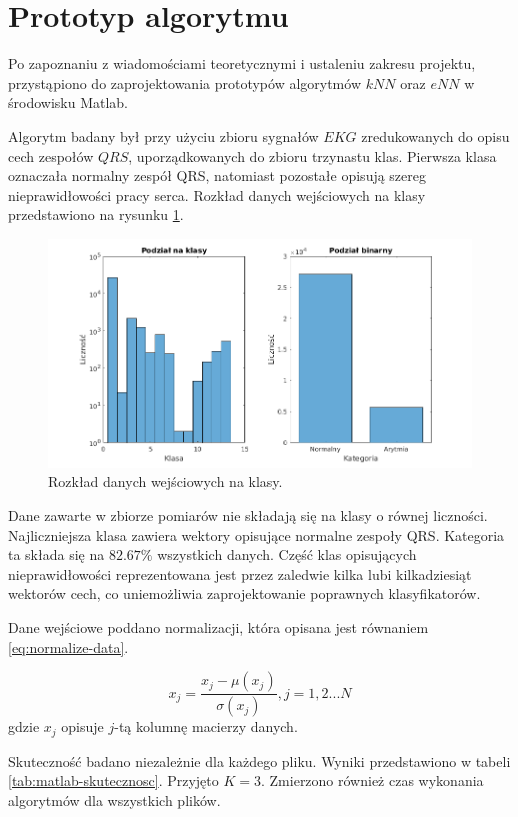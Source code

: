 \section{Prototyp algorytmu}
\label{chap:prototype}
Po zapoznaniu z wiadomościami teoretycznymi i ustaleniu zakresu projektu, przystąpiono do zaprojektowania prototypów algorytmów $kNN$ oraz $eNN$ w środowisku Matlab.

Algorytm badany był przy użyciu zbioru sygnałów $EKG$ zredukowanych do opisu cech zespołów $QRS$, uporządkowanych do zbioru trzynastu klas. Pierwsza klasa oznaczała normalny zespół QRS, natomiast pozostałe opisują szereg nieprawidłowości pracy serca.
Rozkład danych wejściowych na klasy przedstawiono na rysunku \ref{fig:klasy-danych}.

\begin{figure}[H]
	\centering
	\includegraphics[width=18cm]{img/licznosc_klas}
	\caption{Rozkład danych wejściowych na klasy.}
	\label{fig:klasy-danych}
\end{figure}
Dane zawarte w zbiorze pomiarów nie składają się na klasy o równej liczności. Najliczniejsza klasa zawiera wektory opisujące normalne zespoły QRS. Kategoria ta składa się na $82.67\%$ wszystkich danych. Część klas opisujących nieprawidłowości reprezentowana jest przez zaledwie kilka lubi kilkadziesiąt wektorów cech, co uniemożliwia zaprojektowanie poprawnych klasyfikatorów.

Dane wejściowe poddano normalizacji, która opisana jest równaniem \ref{eq:normalize-data}.

\begin{equation}
\label{eq:normalize-data}
x_j = \frac{x_j - \mu(x_j)}{\sigma(x_j)}, j=1,2...N
\end{equation}
gdzie $x_j$ opisuje $j$-tą kolumnę macierzy danych.

Skuteczność badano niezależnie dla każdego pliku. Wyniki przedstawiono w tabeli \ref{tab:matlab-skutecznosc}. Przyjęto $K=3$. Zmierzono również czas wykonania algorytmów dla wszystkich plików.

